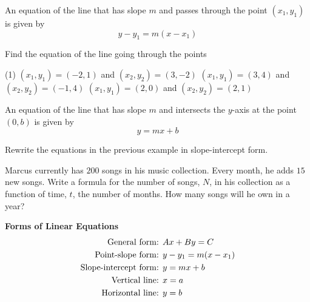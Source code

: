 \documentclass[../mathNotesPreamble]{subfiles}
\begin{document}
    \begin{defn*}
      An equation of the line that has slope $m$ and passes through the point $(x_1,y_1)$ is given by
        \[y-y_1=m(x-x_1)\]
    \end{defn*}
    
    \begin{ex*}
      Find the equation of the line going through the points
    \end{ex*}
    \begin{extasks}[after-item-skip=\stretch{1}](1)
      \task $(x_1,y_1)=(-2,1)$ and $(x_2,y_2)=(3,-2)$
      \task $(x_1,y_1)=(3,4)$ and $(x_2,y_2)=(-1,4)$
      \task $(x_1,y_1)=(2,0)$ and $(x_2,y_2)=(2,1)$
    \end{extasks}
    \pagebreak
    
    \begin{defn*}
      An equation of the line that has slope $m$ and intersects the $y$-axis at the point $(0,b)$ is given by
        \[y=mx+b\]
    \end{defn*}
    \begin{ex*}
      Rewrite the equations in the previous example in slope-intercept form.
    \end{ex*}
    \pagebreak

    \begin{ex*}
      Marcus currently has $200$ songs in his music collection. Every month, he adds $15$ new songs. Write a formula for the number of songs, $N$, in his collection as a function of time, $t$, the number of months. How many songs will he own in a year?
    \end{ex*}

    \textbf{Forms of Linear Equations}
      \begin{align*}
        \textnormal{General form: }& Ax+By=C\\
        \textnormal{Point-slope form: }& y-y_1=m(x-x_1)\\
        \textnormal{Slope-intercept form: }& y=mx+b\\
        \textnormal{Vertical line: }& x=a\\
        \textnormal{Horizontal line: }& y=b
      \end{align*}

    \pagebreak
\end{document}
